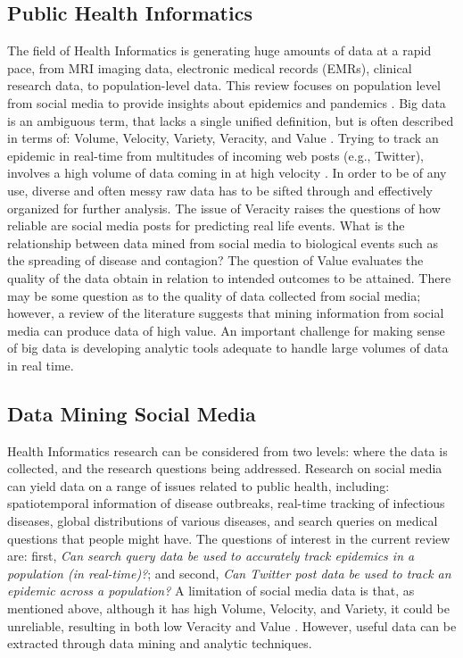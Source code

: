 \documentclass[sigconf]{acmart}
\begin{document}
\subsection{Public Health Informatics}

The field of Health Informatics is generating huge amounts of data at a rapid pace,
from MRI imaging data, electronic medical records (EMRs), clinical research data, to
population-level data. This review focuses on population level from social media to 
provide insights about epidemics and pandemics \cite{hay13, herland14}. Big data is 
an ambiguous term, that lacks a single unified definition, but is often described in 
terms of: Volume, Velocity, Variety, Veracity, and Value \cite{demchenko12}. Trying 
to track an epidemic in real-time from multitudes of incoming web posts (e.g., 
Twitter), involves a high volume of data coming in at high velocity \cite{lamb13, 
paul14}. In order to be of any use, diverse and often messy raw data has to be sifted
through and effectively organized for further analysis. The issue of Veracity raises 
the questions of how reliable are social media posts for predicting real life events.
What is the relationship between data mined from social media to biological events 
such as the spreading of disease and contagion? The question of Value evaluates the 
quality of the data obtain in relation to intended outcomes to be attained. There may
be some question as to the quality of data collected from social media; however, a
review of the literature suggests that mining information from social media can 
produce data of high value. An important challenge for making sense of big data 
is developing analytic tools adequate to handle large volumes of data in real time.

\subsection{Data Mining Social Media}

Health Informatics research can be considered from two levels: where the data 
is collected, and the research questions being addressed. Research on social 
media can yield data on a range of issues related to public health, including: 
spatiotemporal information of disease outbreaks, real-time tracking of infectious
diseases, global distributions of various diseases, and search queries on medical 
questions that people might have. The questions of interest in the current review 
are: first, \textit{Can search query data be used to accurately track epidemics in 
a population (in real-time)?};  and second, \textit{Can Twitter post data be used 
to track an epidemic across a population?} A limitation of social media data is 
that, as mentioned above, although it has high Volume, Velocity, and Variety, it 
could be unreliable, resulting in both low Veracity and Value \cite{hay14, lazer14}. 
However, useful data can be extracted through data mining and analytic techniques. 
\end{document}
